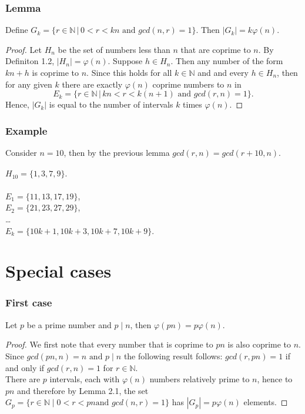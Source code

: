 \documentclass[envcountsect]{beamer}
\begin{document}
\begin{frame}
\frametitle{Lemma}

\begin{lemma}
Define $G_k = \{ r \in \mathbb{N} \, | \, 0 < r < kn \text{ and } gcd(n,r) =
1\} $. Then $|G_k| = k\varphi(n).$
\end{lemma}

\begin{proof}
Let $H_n$ be the set of numbers less than $n$ that are coprime to $n$. By
Definiton 1.2, $|H_n| = \varphi(n)$. Suppose $h \in H_n$. Then any number of the
form $kn + h$ is coprime to $n$. Since this holds for all $k \in \mathbb{N}$ and
and every $h \in H_n$,
then for any given $k$ there are exactly $\varphi(n)$ coprime numbers to $n$ in
$$ E_k = \{ r \in \mathbb{N} \, | \, kn < r < k(n+1) \text{ and } gcd(r,n) = 1\}.$$
Hence, $|G_k|$ is equal to the number of intervals $k$ times $\varphi(n)$. 
\end{proof}

\end{frame}

\begin{frame}
\frametitle{Example}
\begin{example}
Consider $n = 10$, then by the previous lemma $gcd(r,n) =\allowbreak gcd(r+10,n)$. \\~\\
$H_{10} = \{1,3,7,9\}.$ \\~\\
$E_1 = \{11,13,17,19\}$,  \\
$E_2 = \{21,23,27,29\}$, \\
\dots\\
$E_k = \{10k + 1, 10k + 3, 10k + 7, 10k + 9\}$.

\end{example}
\end{frame}

\section{Special cases}

\begin{frame}
\frametitle{First case}

\begin{lemma}
Let $p$ be a prime number and $p \mid n$, then $\varphi(pn) = p\varphi(n)$.
\end{lemma}

\begin{proof}
We first note that every number that is coprime to $pn$ is also coprime to $n$.
Since $gcd(pn,n) = n \text{ and } p \mid n$ the following result follows: $gcd(r,pn) = 1$
if and only if $gcd(r,n) = 1$ for $r \in \mathbb{N}$. \\
There are $p$ intervals, each with $\varphi(n)$ numbers relatively prime to
$n$, hence to $pn$ and therefore by Lemma 2.1, the set $G_p = \{ r \in \mathbb{N} \mid 0<r<pn \text{
and } gcd(n,r) = 1\}$ has $|G_p|=p\varphi(n)$ elements.
\end{proof}

\end{frame}
\end{document}
